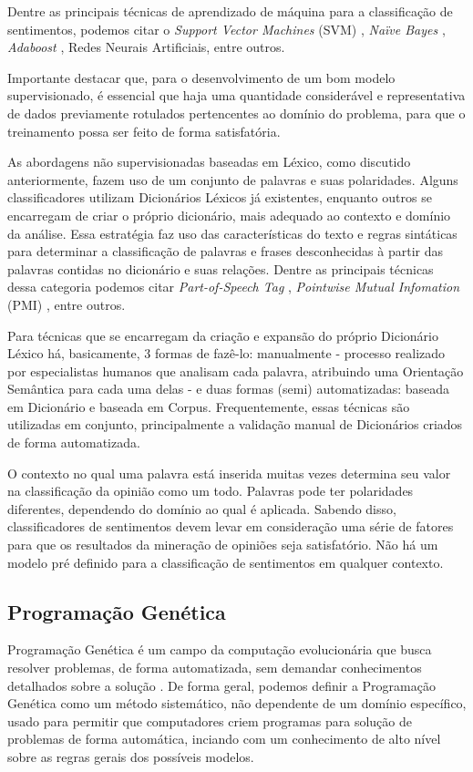 \documentclass[12pt]{article}
\begin{document}
Dentre as principais técnicas de aprendizado de máquina para a classificação de sentimentos, podemos citar o \emph{Support Vector Machines} (SVM) \cite{HADDI2013}, \emph{Naïve Bayes} \cite{Iqbal}, \emph{Adaboost} \cite{graff2017semantic}, Redes Neurais Artificiais, entre outros. \cite{Rodrigues2016}

Importante destacar que, para o desenvolvimento de um bom modelo supervisionado, é essencial que haja uma quantidade considerável e representativa de dados previamente rotulados pertencentes ao domínio do problema, para que o treinamento possa ser feito de forma satisfatória. \cite{araujo2013metodos}

As abordagens não supervisionadas baseadas em Léxico, como discutido anteriormente, fazem uso de um conjunto de palavras e suas polaridades. Alguns classificadores utilizam Dicionários Léxicos já existentes, enquanto outros se encarregam de criar o próprio dicionário, mais adequado ao contexto e domínio da análise. Essa estratégia faz uso das características do texto e regras sintáticas para determinar a classificação de palavras e frases desconhecidas à partir das palavras contidas no dicionário e suas relações. Dentre as principais técnicas dessa categoria podemos citar \emph{Part-of-Speech Tag} \cite{becker2013}, \emph{Pointwise Mutual Infomation} (PMI) \cite{Turney2002}, entre outros.

Para técnicas que se encarregam da criação e expansão do próprio Dicionário Léxico há, basicamente, 3 formas de fazê-lo: manualmente -  processo realizado por especialistas humanos que analisam cada palavra, atribuindo uma Orientação Semântica para cada uma delas -  e duas formas (semi) automatizadas: baseada em Dicionário e baseada em Corpus. Frequentemente, essas técnicas são utilizadas em conjunto, principalmente a validação manual de Dicionários criados de forma automatizada.

O contexto no qual uma palavra está inserida muitas vezes determina seu valor na classificação da opinião como um todo. Palavras pode ter polaridades diferentes, dependendo do domínio ao qual é aplicada. Sabendo disso, classificadores de sentimentos devem levar em consideração uma série de fatores para que os resultados da mineração de opiniões seja satisfatório. Não há um modelo pré definido para a classificação de sentimentos em qualquer contexto.

\subsection{Programação Genética}
\label{progGen}
Programação Genética é um campo da computação evolucionária que busca resolver problemas, de forma automatizada, sem demandar conhecimentos detalhados sobre a solução \cite{koza1992genetic}. De forma geral, podemos definir a Programação Genética como um método sistemático, não dependente de um domínio específico, usado para permitir que computadores criem programas para solução de problemas de forma automática, inciando com um conhecimento de alto nível sobre as regras gerais dos possíveis modelos.
\end{document}
